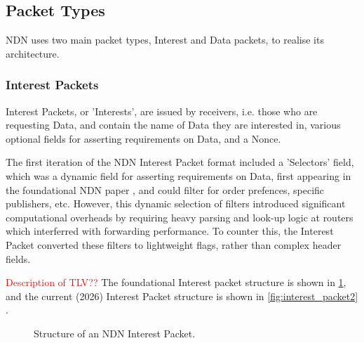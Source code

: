 \documentclass[12pt]{report}
\newcommand{\R}{\textcolor{red}}
\begin{document}
\subsection{Packet Types}
NDN uses two main packet types, Interest and Data packets, to realise its architecture.

\subsubsection{Interest Packets}
Interest Packets, or 'Interests', are issued by receivers, i.e. those who are requesting Data, and contain the name of Data they are interested in, various optional fields for asserting requirements on Data, and a Nonce.

The first iteration of the NDN Interest Packet format included a 'Selectors' field, which was a dynamic field for asserting requirements on Data, first appearing in the foundational NDN paper \cite{zhang_named_2014}, and could filter for order prefences, specific publishers,  etc.
However, this dynamic selection of filters introduced significant computational overheads by requiring heavy parsing and look-up logic at routers which interferred with forwarding performance. To counter this, the Interest Packet converted these filters to lightweight flags, rather than complex header fields.


\R{Description of TLV??}
The foundational Interest packet structure is shown in \cref{fig:interest_packet}, and the current (2026) Interest Packet structure is shown in \cref{fig:interest_packet2} \cite{noauthor_changes_nodate}.

\begin{figure}[h!]
    \centering
    \caption{Structure of an NDN Interest Packet. \cite{zhang_named_2014}}
    \label{fig:interest_packet}
\end{figure}
\end{document}
